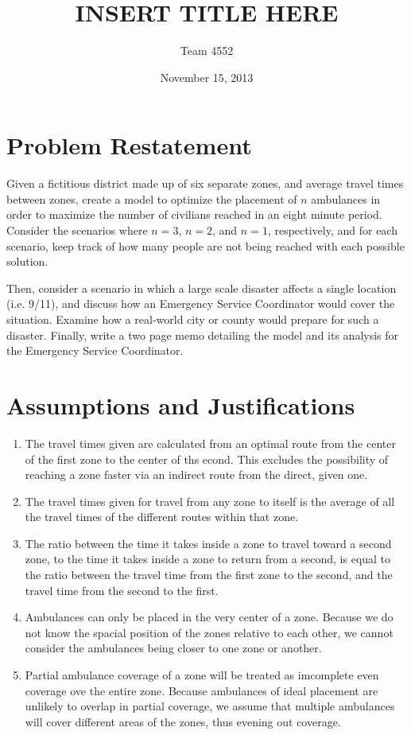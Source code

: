 \documentclass[notitlepage, 12pt]{article}
\title{\textbf{INSERT TITLE HERE}}
\author{Team 4552}
\date{November 15, 2013}
\begin{document}
\maketitle

\tableofcontents
\newpage
\section{Problem Restatement}
Given a fictitious district made up of six separate zones, and average travel times between zones, create a model to optimize the placement of $n$ ambulances in order to maximize the number of civilians reached in an eight minute period. Consider the scenarios where $n = 3$, $n = 2$, and $n = 1$, respectively, and for each scenario, keep track of how many people are not being reached with each possible solution.

Then, consider a scenario in which a large scale disaster affects a single location (i.e. 9/11), and discuss how an Emergency Service Coordinator would cover the situation. Examine how a real-world city or county would prepare for such a disaster. Finally, write a two page memo detailing the model and its analysis for the Emergency Service Coordinator.


\section{Assumptions and Justifications}
\begin{enumerate}
    \item The travel times given are calculated from an optimal route from the center of the first
        zone to the center of ths econd. This excludes the possibility of reaching a zone faster
        via an indirect route from the direct, given one.
    \item The travel times given for travel from any zone to itself is the average
        of all the travel times of the different routes within that zone.
    \item The ratio between the time it takes inside a zone to travel toward a second zone,
        to the time it takes inside a zone to return from a second, is equal to the ratio
        between the travel time from the first zone to the second, and the travel time from the
        second to the first.
    \item
        Ambulances can only be placed in the very center of a zone. Because we do not know the
        spacial position of the zones relative to each other, we cannot consider the ambulances
        being closer to one zone or another.
    \item
        Partial ambulance coverage of a zone will be treated as imcomplete even coverage ove the entire
        zone. Because ambulances of ideal placement are unlikely to overlap in partial coverage, we assume
        that multiple ambulances will cover different areas of the zones, thus evening out coverage.
\end{enumerate}
\end{document}
